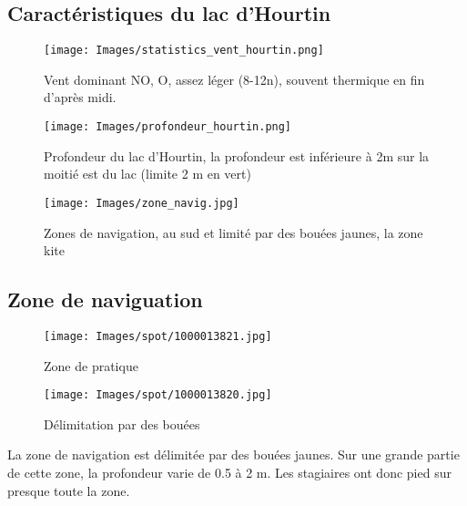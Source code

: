 \documentclass[11pt,a4paper]{report}
\begin{document}
\subsection{Caractéristiques du lac d'Hourtin}
\begin{figure}
\centering
\texttt{[image: Images/statistics\_vent\_hourtin.png]} 
\caption{Vent dominant NO, O, assez léger (8-12n), 
souvent thermique en fin d'après midi.\label{vent_stats}}
\end{figure}

\begin{figure}
\begin{minipage}{0.4\textwidth}
\texttt{[image: Images/profondeur\_hourtin.png]} 
\caption{Profondeur du lac d'Hourtin, la profondeur est inférieure
à 2m sur la moitié est du lac (limite 2 m en vert)\label{carte_profondeur}}
\end{minipage}
\hfill
\begin{minipage}{0.4\textwidth}
\texttt{[image: Images/zone\_navig.jpg]} 
\caption{Zones de navigation, au sud et limité par des bouées jaunes,
 la zone kite\label{zones_nav}}
 \end{minipage}
\end{figure}


\subsection{Zone de naviguation}
\begin{figure}
\begin{minipage}{0.4\textwidth}
\texttt{[image: Images/spot/1000013821.jpg]} 
\caption{Zone de pratique}
\end{minipage}
\hfill
\begin{minipage}{0.4\textwidth}
\texttt{[image: Images/spot/1000013820.jpg]} 
\caption{Délimitation par des bouées}
\end{minipage}
\end{figure}
La zone de navigation est délimitée par des bouées jaunes.
Sur une grande partie de cette zone, la profondeur varie de 0.5 à 2 m.
Les stagiaires ont donc pied sur presque toute la zone.
\end{document}

